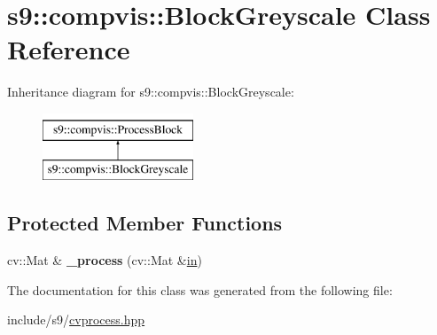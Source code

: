 \hypertarget{classs9_1_1compvis_1_1BlockGreyscale}{\section{s9\-:\-:compvis\-:\-:\-Block\-Greyscale \-Class \-Reference}
\label{classs9_1_1compvis_1_1BlockGreyscale}
}
\-Inheritance diagram for s9\-:\-:compvis\-:\-:\-Block\-Greyscale\-:\begin{figure}[H]
\begin{center}
\leavevmode
\includegraphics[height=2.000000cm]{classs9_1_1compvis_1_1BlockGreyscale}
\end{center}
\end{figure}
\subsection*{\-Protected \-Member \-Functions}
\begin{DoxyCompactItemize}
\item 
\hypertarget{classs9_1_1compvis_1_1BlockGreyscale_a54a28970664d2f1f9817797731408caf}{cv\-::\-Mat \& {\bfseries \-\_\-process} (cv\-::\-Mat \&\hyperlink{structin}{in})}\label{classs9_1_1compvis_1_1BlockGreyscale_a54a28970664d2f1f9817797731408caf}

\end{DoxyCompactItemize}


\-The documentation for this class was generated from the following file\-:\begin{DoxyCompactItemize}
\item 
include/s9/\hyperlink{cvprocess_8hpp}{cvprocess.\-hpp}\end{DoxyCompactItemize}
